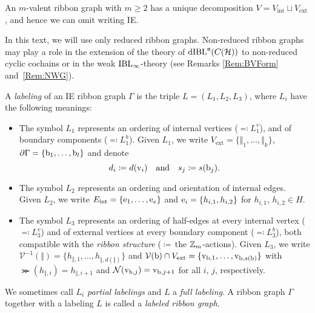 \documentclass[\MainFolder/Text.tex]{subfiles}
\begin{document}
\begin{Remark}
\begin{RemarkList}
\item An $m$-valent ribbon graph with $m\ge 2$ has a unique decomposition $V = V_{\mathrm{int}}\sqcup V_{\mathrm{ext}}$, and hence we can omit writing IE.
\item In this text, we will use only reduced ribbon graphs. Non-reduced ribbon graphs may play a role in the extension of the theory of $\mathrm{dIBL}^{\mathfrak{n}}(C(\mathcal{H}))$ to non-reduced cyclic cochains  or in the weak $\mathrm{IBL}_\infty$-theory (see Remarks \ref{Rem:BVForm} and~\ref{Rem:NWG}).\qedhere
\end{RemarkList}
\end{Remark}

\begin{Def}[Labeling] \label{Def:Labeling}
A \emph{labeling} of an IE ribbon graph $\Gamma$ is the triple $L = (L_1,L_2,L_3)$, where $L_i$ have the following meanings: 
\begin{itemize}
 \item The symbol $L_1$ represents an ordering of internal vertices ($\eqqcolon L_1^v$), and of boundary components ($\eqqcolon L_1^b$). Given $L_1$, we write $V_{\mathrm{ext}} = \{\Vert_1, \dotsc, \Vert_k\}$, $\partial \Gamma = \{\mathrm{b}_1, \dotsc, \mathrm{b}_l\}$ and denote
$$ d_i \coloneqq d(\mathrm{v}_i)\quad\text{and}\quad s_j\coloneqq s(\mathrm{b}_j). $$
 \item The symbol $L_2$ represents an ordering and orientation of internal edges. Given $L_2$, we write $E_{\mathrm{int}} = \{\mathrm{e}_1, \dotsc, \mathrm{e}_e\}$ and $\mathrm{e}_i =\{h_{i,1}, h_{i,2}\}$ for $h_{i,1}$, $h_{i,2}\in H$.
 \item The symbol $L_3$ represents an ordering of half-edges at every internal vertex ($\eqqcolon L_3^v$) and of external vertices at every boundary component ($\eqqcolon L_3^b$), both compatible with the \emph{ribbon structure} ($\coloneqq$\,the $\mathbb{Z}_m$-actions). Given $L_3$, we write $\mathcal{V}^{-1}(\Vert) = \{h_{\Vert,1}, \dotsc,h_{\Vert,d(\Vert)} \}$ and $\mathcal{V}(\mathrm{b}) \cap V_{\mathrm{ext}}= \{\mathrm{v}_{\mathrm{b},1},\dotsc,\mathrm{v}_{\mathrm{b},s(\mathrm{b})}\}$ with $\Succ(h_{\Vert,i}) = h_{\Vert,i+1}$ and $\mathcal{N}(\mathrm{v}_{\mathrm{b},j}) = \mathrm{v}_{\mathrm{b},j+1}$ for all $i$, $j$, respectively. 
\end{itemize}
We sometimes call $L_i$ \emph{partial labelings} and $L$ a \emph{full labeling}. A ribbon graph $\Gamma$ together with a labeling $L$ is called a \emph{labeled ribbon graph}.
\end{Def}
\end{document}
